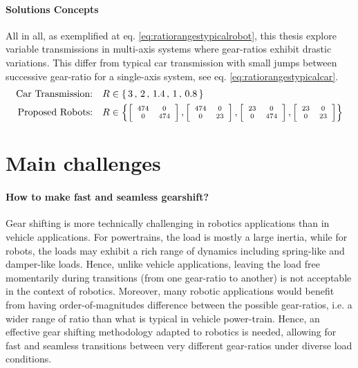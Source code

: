 \paragraph{Solutions Concepts}
%
All in all, as exemplified at eq. \eqref{eq:ratiorangestypicalrobot}, this thesis explore variable transmissions in multi-axis systems where gear-ratios exhibit drastic variations. This differ from typical car transmission with small jumps between successive gear-ratio for a single-axis system, see eq. \eqref{eq:ratiorangestypicalcar}.
%
\begin{align}
  \text{Car Transmission:}& \quad R \in \{ \, 3 \, , \,  2 \, , \, 1.4 \, , \, 1 \, , \, 0.8 \, \} 
	\label{eq:ratiorangestypicalcar}
	\\
	\text{Proposed Robots:}& \quad R \in 
	\scriptsize
	\left \{
	\left[
	\begin{array}{c c}
	474 & 0 \\ 0 & 474
	\end{array} 
	\right]
	,
	\left[
	\begin{array}{c c}
	474 & 0 \\ 0 & 23
	\end{array} 
	\right]
	,
	\left[
	\begin{array}{c c}
	23 & 0 \\ 0 & 474
	\end{array} 
	\right]
	,
	\left[
	\begin{array}{c c}
	23 & 0 \\ 0 & 23
	\end{array} 
	\right]
	\right \}
 \label{eq:ratiorangestypicalrobot}
\end{align}


\newpage

\section{Main challenges}
\label{sec:MainChallenges}

\paragraph{How to make fast and seamless gearshift?}
Gear shifting is more technically challenging in robotics applications than in vehicle applications. For powertrains, the load is mostly a large inertia, while for robots, the loads may exhibit a rich range of dynamics including spring-like and damper-like loads. Hence, unlike vehicle applications, leaving the load free momentarily during transitions (from one gear-ratio to another) is not acceptable in the context of robotics. Moreover, many robotic applications would benefit from having order-of-magnitudes difference between the possible gear-ratios, i.e. a wider range of ratio than what is typical in vehicle power-train. Hence, an effective gear shifting methodology adapted to robotics is needed, allowing for fast and seamless transitions between very different gear-ratios under diverse load conditions.


